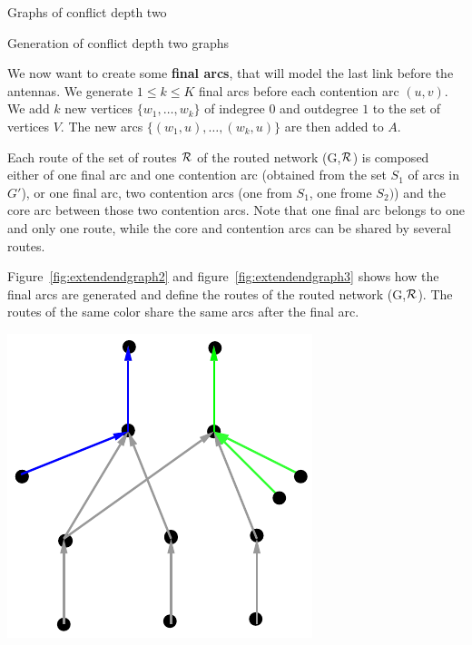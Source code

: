\documentclass[10pt]{article}
\begin{document}
\begin{section}{Graphs of conflict depth two}
\begin{subsection}{Generation of conflict depth two graphs}
\begin{minipage}{.5\linewidth}
\end{minipage}

 We now want to create some \textbf{final arcs}, that will model the last link before the antennas.
We generate $1\leq k\leq K$ final arcs before each contention arc $(u,v)$. We add $k$ new vertices $\{w_1,\ldots,w_k\}$ of indegree $0$ and outdegree $1$ to the set of vertices $V$. The new arcs $\{(w_1,u),\ldots,(w_k,u)\}$ are then added to $A$. 

Each route of the set of routes $\cal{R}$ of the routed network (G,$\cal{R}$) is composed either of one final arc and one contention arc (obtained from the set $S_1$ of arcs in $G'$), or one final arc, two contention arcs (one from $S_1$, one frome $S_2)$) and the core arc between those two contention arcs.
Note that one final arc belongs to one and only one route, while the core and contention arcs can be shared by several routes. 

Figure~\ref{fig:extendendgraph2} and figure~\ref{fig:extendendgraph3} shows how the final arcs are generated and define the routes of the routed network (G,$\cal{R}$). The routes of the same color share the same arcs after the final arc.

\begin{minipage}{.5\linewidth}

\begin{center}
\includegraphics[width=0.4\linewidth]{extendendgraph2}
\label{fig:extendendgraph2}
\end{center}


\end{minipage}
\end{subsection}
\end{section}
\end{document}

